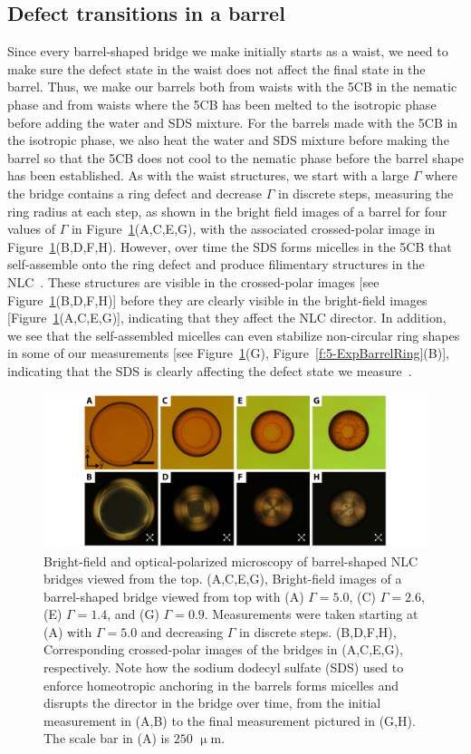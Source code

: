 \subsection{Defect transitions in a barrel}
Since every barrel-shaped bridge we make initially starts as a waist, we need to make sure the defect state in the waist does not affect the final state in the barrel.
Thus, we make our barrels both from waists with the 5CB in the nematic phase and from waists where the 5CB has been melted to the isotropic phase before adding the water and SDS mixture.
For the barrels made with the 5CB in the isotropic phase, we also heat the water and SDS mixture before making the barrel so that the 5CB does not cool to the nematic phase before the barrel shape has been established.
As with the waist structures, we start with a large $\Gamma$ where the bridge contains a ring defect and decrease $\Gamma$ in discrete steps, measuring the ring radius at each step, as shown in the bright field images of a barrel for four values of $\Gamma$ in Figure~\ref{f:5-ExpBarrelTop}(A,C,E,G), with the associated crossed-polar image in Figure~\ref{f:5-ExpBarrelTop}(B,D,F,H).
However, over time the SDS forms micelles in the 5CB that self-assemble onto the ring defect and produce filimentary structures in the NLC~\cite{RN279}.
These structures are visible in the crossed-polar images [see Figure~\ref{f:5-ExpBarrelTop}(B,D,F,H)] before they are clearly visible in the bright-field images [Figure~\ref{f:5-ExpBarrelTop}(A,C,E,G)], indicating that they affect the NLC director.
In addition, we see that the self-assembled micelles can even stabilize non-circular ring shapes in some of our measurements [see Figure~\ref{f:5-ExpBarrelTop}(G), Figure~\ref{f:5-ExpBarrelRing}(B)], indicating that the SDS is clearly affecting the defect state we measure~\cite{RN279,RN280}.
\begin{figure}
  \centering
  \includegraphics{figures/C5/Ch5-Figs_ExpBarrelTop.png}
  \caption{Bright-field and optical-polarized microscopy of barrel-shaped NLC bridges viewed from the top.
  (A,C,E,G), Bright-field images of a barrel-shaped bridge viewed from top with (A) $\Gamma = 5.0$, (C) $\Gamma = 2.6$, (E) $\Gamma = 1.4$, and (G) $\Gamma = 0.9$.
  Measurements were taken starting at (A) with $\Gamma = 5.0$ and decreasing $\Gamma$ in discrete steps.
  (B,D,F,H), Corresponding crossed-polar images of the bridges in (A,C,E,G), respectively.
  Note how the sodium dodecyl sulfate (SDS) used to enforce homeotropic anchoring in the barrels forms micelles and disrupts the director in the bridge over time, from the initial measurement in (A,B) to the final measurement pictured in (G,H).
  The scale bar in (A) is $250$ $\upmu$m.}\label{f:5-ExpBarrelTop}
\end{figure}

